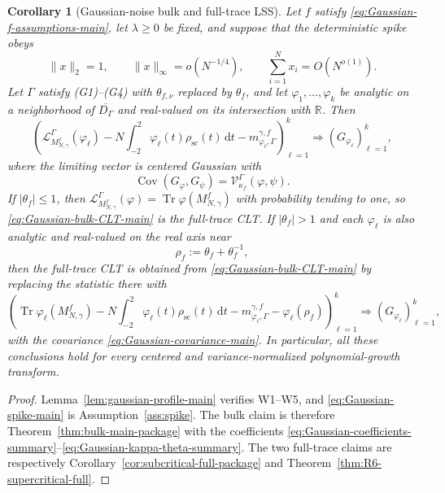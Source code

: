 \documentclass[10pt,a4paper]{amsart}
\newtheorem{corollary}[theorem]{Corollary}
\newcommand{\Cov}{\operatorname{Cov}}
\newcommand{\Tr}{\operatorname{Tr}}
\newcommand{\scal}{\mathrm{sc}}
\newcommand{\dd}{\mathrm d}
\newcommand{\norm}[1]{\lVert #1\rVert}
\begin{document}
\begin{corollary}[Gaussian-noise bulk and full-trace LSS]
\label{cor:gaussian-LSS-main}
Let $f$ satisfy \eqref{eq:Gaussian-f-assumptions-main}, let $\lambda\ge0$ be
fixed, and suppose that the deterministic spike obeys
\begin{equation}\label{eq:Gaussian-spike-main}
 \norm{x}_2=1,
 \qquad
 \norm{x}_\infty=o(N^{-1/4}),
 \qquad
 \sum_{i=1}^N x_i=O(N^{o(1)}).
\end{equation}
Let $\Gamma$ satisfy (G1)--(G4) with $\theta_{f,\nu}$ replaced by $\theta_f$,
and let $\varphi_1,\ldots,\varphi_k$ be analytic on a neighborhood of
$\overline{D_\Gamma}$ and real-valued on its intersection with $\mathbb R$.
Then
\begin{equation}\label{eq:Gaussian-bulk-CLT-main}
 \left(
 \mathcal L_{M_{N,\gamma}^f}^{\Gamma}(\varphi_\ell)
 -N\int_{-2}^2\varphi_\ell(t)\rho_{\scal}(t)\,\dd t
 -m_{\varphi_\ell,\Gamma}^{\gamma,f}
 \right)_{\ell=1}^k
 \Longrightarrow
 (G_{\varphi_\ell})_{\ell=1}^k,
\end{equation}
where the limiting vector is centered Gaussian with
\begin{equation}\label{eq:Gaussian-covariance-main}
 \Cov(G_\varphi,G_\psi)
 =\mathcal V_{\kappa_f}^{\Gamma}(\varphi,\psi).
\end{equation}
If $|\theta_f|\le1$, then
$\mathcal L_{M_{N,\gamma}^f}^{\Gamma}(\varphi)
=\Tr\varphi(M_{N,\gamma}^f)$ with probability tending to one, so
\eqref{eq:Gaussian-bulk-CLT-main} is the full-trace CLT.  If
$|\theta_f|>1$ and each $\varphi_\ell$ is also analytic and real-valued on the
real axis near
\begin{equation}\label{eq:Gaussian-outlier-main}
 \rho_f:=\theta_f+\theta_f^{-1},
\end{equation}
then the full-trace CLT is obtained from
\eqref{eq:Gaussian-bulk-CLT-main} by replacing the statistic there with
\begin{equation}\label{eq:Gaussian-full-supercritical-main}
 \left(
 \Tr\varphi_\ell(M_{N,\gamma}^f)
 -N\int_{-2}^2\varphi_\ell(t)\rho_{\scal}(t)\,\dd t
 -m_{\varphi_\ell,\Gamma}^{\gamma,f}
 -\varphi_\ell(\rho_f)
 \right)_{\ell=1}^k
 \Longrightarrow
 (G_{\varphi_\ell})_{\ell=1}^k,
\end{equation}
with the covariance \eqref{eq:Gaussian-covariance-main}.
In particular, all these conclusions hold for every centered and
variance-normalized polynomial-growth transform.
\end{corollary}

\begin{proof}
Lemma~\ref{lem:gaussian-profile-main} verifies W1--W5, and
\eqref{eq:Gaussian-spike-main} is Assumption~\ref{ass:spike}.  The bulk claim
is therefore Theorem~\ref{thm:bulk-main-package} with the coefficients
\eqref{eq:Gaussian-coefficients-summary}--\eqref{eq:Gaussian-kappa-theta-summary}.
The two full-trace claims are respectively
Corollary~\ref{cor:subcritical-full-package} and
Theorem~\ref{thm:R6-supercritical-full}.
\end{proof}
\end{document}
